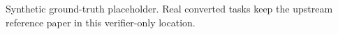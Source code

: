 Synthetic ground-truth placeholder. Real converted tasks keep the upstream reference paper in this verifier-only location.
